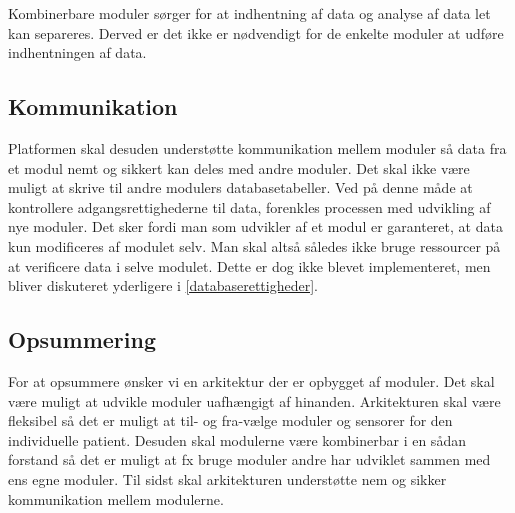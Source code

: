 Kombinerbare moduler sørger for at indhentning af data og analyse af data let kan separeres.
Derved er det ikke er nødvendigt for de enkelte moduler at udføre indhentningen af data.

\subsection{Kommunikation}
Platformen skal desuden understøtte kommunikation mellem moduler så data fra et modul nemt og sikkert kan deles med andre moduler.
Det skal ikke være muligt at skrive til andre modulers databasetabeller.
Ved på denne måde at kontrollere adgangsrettighederne til data, forenkles processen med udvikling af nye moduler.
Det sker fordi man som udvikler af et modul er garanteret, at data kun modificeres af modulet selv.
Man skal altså således ikke bruge ressourcer på at verificere data i selve modulet.
Dette er dog ikke blevet implementeret, men bliver diskuteret yderligere i \cref{databaserettigheder}.


\subsection{Opsummering}
For at opsummere ønsker vi en arkitektur der er opbygget af moduler.
Det skal være muligt at udvikle moduler uafhængigt af hinanden.
Arkitekturen skal være fleksibel så det er muligt at til- og fra-vælge moduler og sensorer for den individuelle patient.
Desuden skal modulerne være kombinerbar i en sådan forstand så det er muligt at fx bruge moduler andre har udviklet sammen med ens egne moduler.
Til sidst skal arkitekturen understøtte nem og sikker kommunikation mellem modulerne.


